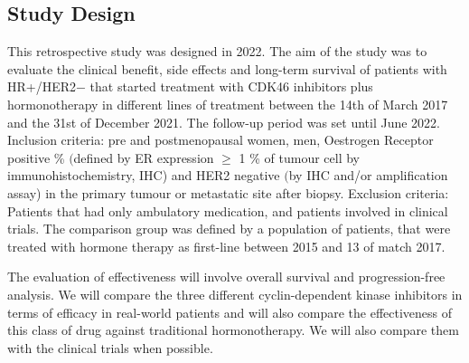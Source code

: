 

\subsection{Study Design}


This retrospective study was designed in 2022. The aim of the study was to evaluate the clinical benefit, side effects and long-term survival of patients with HR+/HER2$-$ that started treatment with CDK4\/6 inhibitors plus hormonotherapy in different lines of treatment between the 14th of March 2017 and the 31st of December 2021. The follow-up period was set until June 2022. 
Inclusion criteria: pre and postmenopausal women, men, Oestrogen Receptor positive \% $($defined by ER expression $\geq$ 1 \% of tumour cell by immunohistochemistry, IHC)
and HER2 negative $($by IHC and/or amplification assay) in the primary tumour or metastatic site after biopsy.
Exclusion criteria: Patients that had only ambulatory medication, and patients involved in clinical trials.
The comparison group was defined by a population of patients, that were treated with hormone therapy as first-line between 2015 and 13 of match 2017.

The evaluation of effectiveness will involve overall survival and progression-free analysis. We will compare the three different cyclin-dependent kinase inhibitors in terms of efficacy in real-world patients and will also compare the effectiveness of this class of drug against traditional hormonotherapy. We will also compare them with the clinical trials when possible. 


